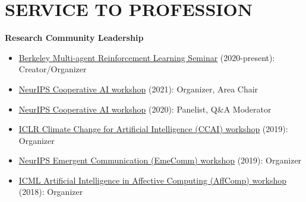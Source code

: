 \documentclass[paper=letter,fontsize=11pt]{scrartcl} %
\newcommand{\NewPart}[2]{\section*{\uppercase{#1} #2}}
\newcommand{\CommitteeEntry}[4]{
        \noindent \href{#4}{#1} (#2): #3}
\begin{document}
\NewPart{Service to Profession}{}
\textbf{Research Community Leadership}
\begin{itemize}
    \item \CommitteeEntry{Berkeley Multi-agent Reinforcement Learning Seminar}{2020-present}{Creator/Organizer}{https://sites.google.com/corp/view/berkeleymarl/home}
    \item \CommitteeEntry{NeurIPS Cooperative AI workshop}{2021}{Organizer, Area Chair}{https://www.cooperativeai.com/neurips-2021/workshop-information}
    \item \CommitteeEntry{NeurIPS Cooperative AI workshop}{2020}{Panelist, Q\&A Moderator}{https://www.cooperativeai.com/neurips-2020/speakers}
    \item \CommitteeEntry{ICLR Climate Change for Artificial Intelligence (CCAI) workshop}{2019}{Organizer}{https://www.climatechange.ai/events/iclr2020.html}
    \item \CommitteeEntry{NeurIPS Emergent Communication (EmeComm) workshop}{2019}{Organizer}{https://sites.google.com/corp/view/emecom2019/home}
    \item \CommitteeEntry{ICML Artificial Intelligence in Affective Computing (AffComp) workshop}{2018}{Organizer}{https://icml.cc/Conferences/2018/Schedule?showEvent=3304}
\end{itemize}
\end{document}

